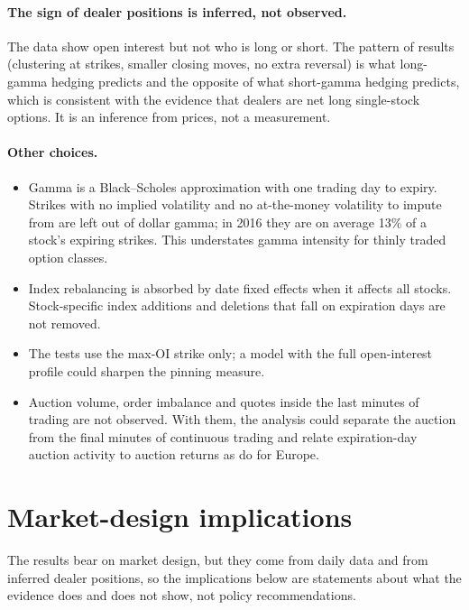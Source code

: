 \documentclass[11pt,a4paper]{article}
\begin{document}
\paragraph{The sign of dealer positions is inferred, not observed.} The data show open interest but not who is long or short. The pattern of results (clustering at strikes, smaller closing moves, no extra reversal) is what long-gamma hedging predicts and the opposite of what short-gamma hedging predicts, which is consistent with the evidence that dealers are net long single-stock options. It is an inference from prices, not a measurement.

\paragraph{Other choices.}
\begin{itemize}
\item Gamma is a Black--Scholes approximation with one trading day to expiry. Strikes with no implied volatility and no at-the-money volatility to impute from are left out of dollar gamma; in 2016 they are on average 13\% of a stock's expiring strikes. This understates gamma intensity for thinly traded option classes.
\item Index rebalancing is absorbed by date fixed effects when it affects all stocks. Stock-specific index additions and deletions that fall on expiration days are not removed.
\item The tests use the max-OI strike only; a model with the full open-interest profile could sharpen the pinning measure.
\item Auction volume, order imbalance and quotes inside the last minutes of trading are not observed. With them, the analysis could separate the auction from the final minutes of continuous trading and relate expiration-day auction activity to auction returns as \citet{ComertonFordeRindi2022} do for Europe.
\end{itemize}

\section{Market-design implications}

The results bear on market design, but they come from daily data and from inferred dealer positions, so the implications below are statements about what the evidence does and does not show, not policy recommendations.
\end{document}
